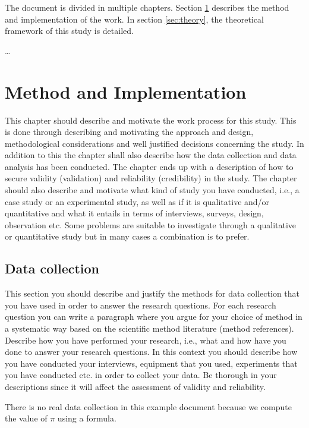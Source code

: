 \documentclass[a4paper, 12pt]{report}
\begin{document}
\medskip
The document is divided in multiple chapters. Section \ref{sec:method} describes the method and implementation of the work. In section \ref{sec:theory}, the theoretical framework of this study is detailed.

\dots


\chapter{Method and Implementation}
\label{sec:method}

\textcolor{jupurple}{
This chapter should describe and motivate the work process for this study. This is done through describing and motivating the approach and design, methodological considerations and well justified decisions concerning the study. In addition to this the chapter shall also describe how the data collection and data analysis has been conducted. The chapter ends up with a description of how to secure validity (validation) and reliability (credibility) in the study.
The chapter should also describe and motivate what kind of study you have conducted, i.e., a case study or an experimental study, as well as if it is qualitative and/or quantitative and what it entails in terms of interviews, surveys, design, observation etc. 
Some problems are suitable to investigate through a qualitative or quantitative study but in many cases a combination is to prefer.
}

\section{Data collection}

\textcolor{jupurple}{
This section you should describe and justify the methods for data collection that you have used in order to answer the research questions. For each research question you can write a paragraph where you argue for your choice of method in a systematic way based on the scientific method literature (method references). 
Describe how you have performed your research, i.e., what and how have you done to answer your research questions. In this context you should describe how you have conducted your interviews, equipment that you used, experiments that you have conducted etc. in order to collect your data. Be thorough in your descriptions since it will affect the assessment of validity and reliability.
}

\medskip
There is no real data collection in this example document because we compute the value of $\pi$ using a formula.
\end{document}
